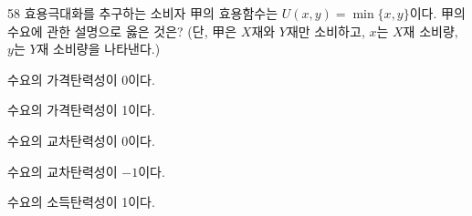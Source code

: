 \begin{question}{58}
효용극대화를 추구하는 소비자 甲의 효용함수는 $U(x,y)=\min\{x,y\}$이다. 甲의 수요에 관한 설명으로 옳은 것은? (단, 甲은 $X$재와 $Y$재만 소비하고, $x$는 $X$재 소비량, $y$는 $Y$재 소비량을 나타낸다.)
\begin{choices}
  \item 수요의 가격탄력성이 0이다.
  \item 수요의 가격탄력성이 1이다.
  \item 수요의 교차탄력성이 0이다.
  \item 수요의 교차탄력성이 $-1$이다.
  \item 수요의 소득탄력성이 1이다.
\end{choices}
\end{question}
